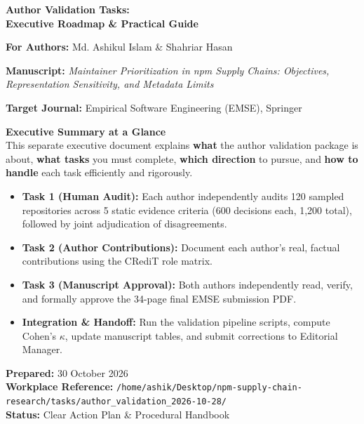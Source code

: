 \documentclass[11pt,a4paper]{article}
\begin{document}
\begin{titlepage}
\vspace*{10mm}
{\color{taskblue}\Huge\bfseries Author Validation Tasks:\\[6pt]Executive Roadmap \& Practical Guide\par}
\vspace{6mm}
{\Large\textbf{For Authors:} Md. Ashikul Islam \& Shahriar Hasan\par}
\vspace{3mm}
{\large\textbf{Manuscript:} \textit{Maintainer Prioritization in npm Supply Chains: Objectives, Representation Sensitivity, and Metadata Limits}\par}
{\large\textbf{Target Journal:} Empirical Software Engineering (EMSE), Springer\par}
\vspace{8mm}

\colorbox{taskpale}{
\parbox{0.96\linewidth}{
\vspace{3mm}
\textbf{\large\color{taskblue}Executive Summary at a Glance}\\[4pt]
This separate executive document explains \textbf{what} the author validation package is about, \textbf{what tasks} you must complete, \textbf{which direction} to pursue, and \textbf{how to handle} each task efficiently and rigorously.
\begin{itemize}[leftmargin=15pt,topsep=4pt]
  \item \textbf{Task 1 (Human Audit):} Each author independently audits 120 sampled repositories across 5 static evidence criteria (600 decisions each, 1,200 total), followed by joint adjudication of disagreements.
  \item \textbf{Task 2 (Author Contributions):} Document each author's real, factual contributions using the CRediT role matrix.
  \item \textbf{Task 3 (Manuscript Approval):} Both authors independently read, verify, and formally approve the 34-page final EMSE submission PDF.
  \item \textbf{Integration \& Handoff:} Run the validation pipeline scripts, compute Cohen's $\kappa$, update manuscript tables, and submit corrections to Editorial Manager.
\end{itemize}
\vspace{2mm}
}
}

\vfill
\noindent\textbf{Prepared:} 30 October 2026\\
\textbf{Workplace Reference:} \nolinkurl{/home/ashik/Desktop/npm-supply-chain-research/tasks/author_validation_2026-10-28/}\\
\textbf{Status:} Clear Action Plan \& Procedural Handbook
\end{titlepage}
\end{document}
